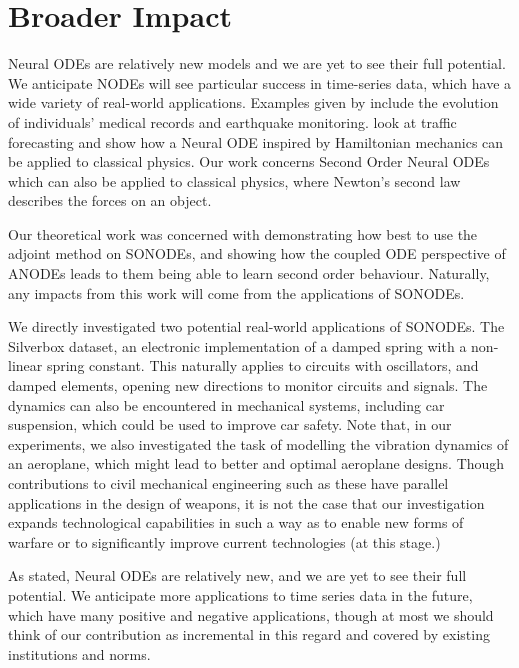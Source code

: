 \documentclass{article}
\theoremstyle{remark}
\theoremstyle{definition}
\begin{document}
\clearpage

\section*{Broader Impact}
Neural ODEs are relatively new models and we are yet to see their full potential. We anticipate NODEs will see particular success in time-series data, which have a wide variety of real-world applications. Examples given by \citet{jia2019neural} include the evolution of individuals' medical records and earthquake monitoring. \citet{poli2019graph} look at traffic forecasting and \citet{greydanus2019hamiltonian} show how a Neural ODE inspired by Hamiltonian mechanics can be applied to classical physics. Our work concerns Second Order Neural ODEs which can also be applied to classical physics, where Newton's second law describes the forces on an object. 

Our theoretical work was concerned with demonstrating how best to use the adjoint method on SONODEs, and showing how the coupled ODE perspective of ANODEs leads to them being able to learn second order behaviour. Naturally, any impacts from this work will come from the applications of SONODEs.

We directly investigated two potential real-world applications of SONODEs. The Silverbox dataset, an electronic implementation of a damped spring with a non-linear spring constant. This naturally applies to circuits with oscillators, and damped elements, opening new directions to monitor circuits and signals. The dynamics can also be encountered in mechanical systems, including car suspension, which could be used to improve car safety. Note that, in our experiments, we also investigated the task of modelling the vibration dynamics of an aeroplane, which might lead to better and optimal aeroplane designs. Though contributions to civil mechanical engineering such as these have parallel applications in the design of weapons, it is not the case that our investigation expands technological capabilities in such a way as to enable new forms of warfare or to significantly improve current technologies (at this stage.)

As stated, Neural ODEs are relatively new, and we are yet to see their full potential. We anticipate more applications to time series data in the future, which have many positive and negative applications, though at most we should think of our contribution as incremental in this regard and covered by existing institutions and norms.
\end{document}
